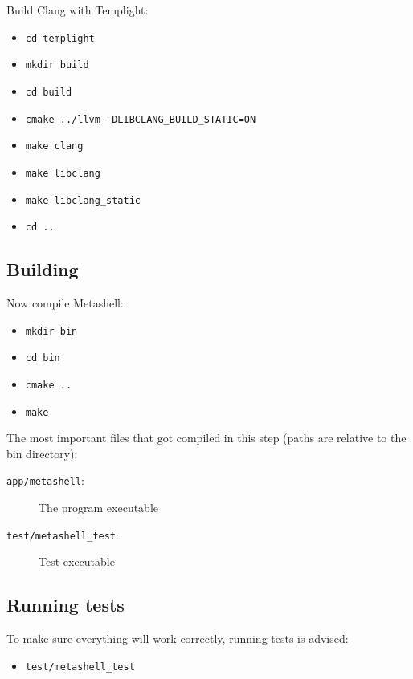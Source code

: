 Build Clang with Templight\cite{templight}:

\begin{itemize}
    \item \texttt{cd templight}
    \item \texttt{mkdir build}
    \item \texttt{cd build}
    \item \texttt{cmake ../llvm -DLIBCLANG\_BUILD\_STATIC=ON}
    \item \texttt{make clang}
    \item \texttt{make libclang}
    \item \texttt{make libclang\_static}
    \item \texttt{cd ..}
\end{itemize}

\subsection{Building}

Now compile Metashell:

\begin{itemize}
    \item \texttt{mkdir bin}
    \item \texttt{cd bin}
    \item \texttt{cmake ..}
    \item \texttt{make}
\end{itemize}

The most important files that got compiled in this step (paths are relative to
the bin directory):

\begin{description}
    \item[\texttt{app/metashell}:] The program executable
    \item[\texttt{test/metashell\_test}:] Test executable
\end{description}

\subsection{Running tests}

To make sure everything will work correctly, running tests is advised:

\begin{itemize}
    \item \texttt{test/metashell\_test}
\end{itemize}

